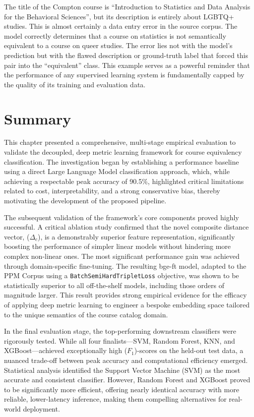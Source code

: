 The title of the Compton course is ``Introduction to Statistics and Data Analysis for the Behavioral Sciences'', but its description is entirely about LGBTQ+ studies. This is almost certainly a data entry error in the source corpus. The model correctly determines that a course on statistics is not semantically equivalent to a course on queer studies. The error lies not with the model's prediction but with the flawed description or ground-truth label that forced this pair into the ``equivalent'' class. This example serves as a powerful reminder that the performance of any supervised learning system is fundamentally capped by the quality of its training and evaluation data.

\section{Summary}
This chapter presented a comprehensive, multi-stage empirical evaluation to validate the decoupled, deep metric learning framework for course equivalency classification. The investigation began by establishing a performance baseline using a direct Large Language Model classification approach, which, while achieving a respectable peak accuracy of 90.5\%, highlighted critical limitations related to cost, interpretability, and a strong conservative bias, thereby motivating the development of the proposed pipeline.

The subsequent validation of the framework's core components proved highly successful. A critical ablation study confirmed that the novel composite distance vector, (\(\Delta_c\)), is a demonstrably superior feature representation, significantly boosting the performance of simpler linear models without hindering more complex non-linear ones. The most significant performance gain was achieved through domain-specific fine-tuning. The resulting bge-ft model, adapted to the PPM Corpus using a \verb|BatchSemiHardTripletLoss| objective, was shown to be statistically superior to all off-the-shelf models, including those orders of magnitude larger. This result provides strong empirical evidence for the efficacy of applying deep metric learning to engineer a bespoke embedding space tailored to the unique semantics of the course catalog domain.

In the final evaluation stage, the top-performing downstream classifiers were rigorously tested. While all four finalists---SVM, Random Forest, KNN, and XGBoost---achieved exceptionally high (\(F_1\))-scores on the held-out test data, a nuanced trade-off between peak accuracy and computational efficiency emerged. Statistical analysis identified the Support Vector Machine (SVM) as the most accurate and consistent classifier. However, Random Forest and XGBoost proved to be significantly more efficient, offering nearly identical accuracy with more reliable, lower-latency inference, making them compelling alternatives for real-world deployment.

